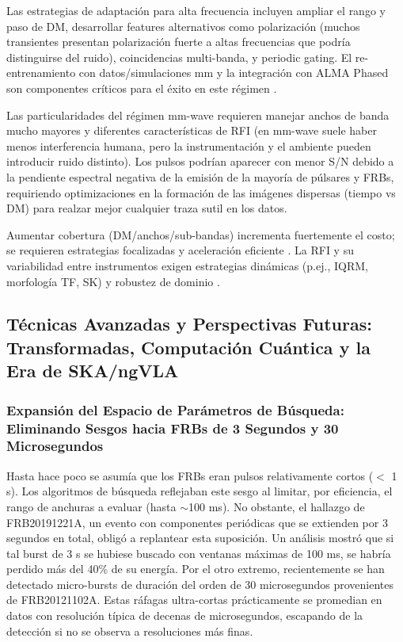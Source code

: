 Las estrategias de adaptación para alta frecuencia incluyen ampliar el rango y paso de DM, desarrollar features alternativos como polarización (muchos transientes presentan polarización fuerte a altas frecuencias que podría distinguirse del ruido), coincidencias multi-banda, y periodic gating. El re-entrenamiento con datos/simulaciones mm y la integración con ALMA Phased son componentes críticos para el éxito en este régimen \citep{veracasanova2025}.

Las particularidades del régimen mm-wave requieren manejar anchos de banda mucho mayores y diferentes características de RFI (en mm-wave suele haber menos interferencia humana, pero la instrumentación y el ambiente pueden introducir ruido distinto). Los pulsos podrían aparecer con menor S/N debido a la pendiente espectral negativa de la emisión de la mayoría de púlsares y FRBs, requiriendo optimizaciones en la formación de las imágenes dispersas (tiempo vs DM) para realzar mejor cualquier traza sutil en los datos.

Aumentar cobertura (DM/anchos/sub-bandas) incrementa fuertemente el costo; se requieren estrategias focalizadas y aceleración eficiente \citep{zhang2024drafts,Zackay_2014_FDMT}. La RFI y su variabilidad entre instrumentos exigen estrategias dinámicas (p.ej., IQRM, morfología TF, SK) y robustez de dominio \citep{Morello_2021_IQRM,Offringa2010,Offringa2012}.

\subsection{Técnicas Avanzadas y Perspectivas Futuras: Transformadas, Computación Cuántica y la Era de SKA/ngVLA}

\subsubsection{Expansión del Espacio de Parámetros de Búsqueda: Eliminando Sesgos hacia FRBs de 3 Segundos y 30 Microsegundos}

Hasta hace poco se asumía que los FRBs eran pulsos relativamente cortos ($<$ 1 s). Los algoritmos de búsqueda reflejaban este sesgo al limitar, por eficiencia, el rango de anchuras a evaluar (hasta $\sim$100 ms). No obstante, el hallazgo de FRB20191221A, un evento con componentes periódicas que se extienden por 3 segundos en total, obligó a replantear esta suposición. Un análisis mostró que si tal burst de 3 s se hubiese buscado con ventanas máximas de 100 ms, se habría perdido más del 40\% de su energía. Por el otro extremo, recientemente se han detectado micro-bursts de duración del orden de 30 microsegundos provenientes de FRB20121102A. Estas ráfagas ultra-cortas prácticamente se promedian en datos con resolución típica de decenas de microsegundos, escapando de la detección si no se observa a resoluciones más finas.

